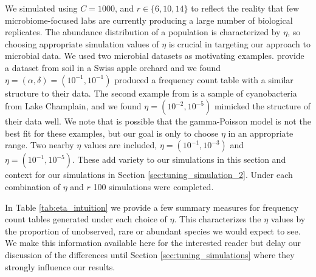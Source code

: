\documentclass[oupdraft]{bio}
\begin{document}
We simulated using $C = 1000$, and $r \in \{6, 10, 14\}$ to reflect the reality that few microbiome-focused labs are currently producing a large number of biological replicates.  The abundance distribution of a population is characterized by $\eta$, so choosing appropriate simulation values of $\eta$ is crucial in targeting our approach to microbial data.   We used two microbial datasets as motivating examples.  \citet{walsh2014restricted} provide a dataset from soil in a Swiss apple orchard and we found $\eta = (\alpha, \delta) = (10^{-1}, 10^{-1})$ produced a frequency count table with a similar structure to their data.  The second example from \citet{tromas_2017} is a sample of cyanobacteria from Lake Champlain, and we found $\eta = (10^{-2}, 10^{-5})$ mimicked the structure of their data well.  We note that is possible that the gamma-Poisson model is not the best fit for these examples, but our goal is only to choose $\eta$ in an appropriate range.  Two nearby $\eta$ values are included, $\eta = \left( 10^{-1}, 10^{-3} \right)$ and $\eta = \left( 10^{-1}, 10^{-5}\right)$.  These add variety to our simulations in this section and context for our simulations in Section \ref{sec:tuning_simulation_2}.  Under each combination of $\eta$ and $r$ 100 simulations were completed.

In Table \ref{tab:eta_intuition} we provide a few summary measures for frequency count tables generated under each choice of $\eta$.  This characterizes the $\eta$ values by the proportion of unobserved, rare or abundant species we would expect to see.  We make this information available here for the interested reader but delay our discussion of the differences until Section \ref{sec:tuning_simulations} where they strongly influence our results.
\end{document}
